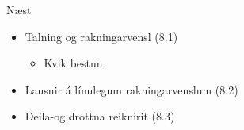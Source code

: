 \documentclass[handout]{beamer}
\begin{document}
\begin{frame}{Næst}
\begin{itemize}
    \item Talning og rakningarvensl (8.1)
    \begin{itemize}
        \item Kvik bestun
    \end{itemize}
    \item Lausnir á línulegum rakningarvenslum (8.2)
    \item Deila-og drottna reiknirit (8.3)
\end{itemize}
\end{frame}
\end{document}

